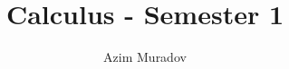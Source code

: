 \documentclass[11pt,a4paper,titlepage]{article}
\title{Calculus - Semester 1}
\author{Azim Muradov}
\begin{document}
\maketitle
\blindtext
\end{document}
